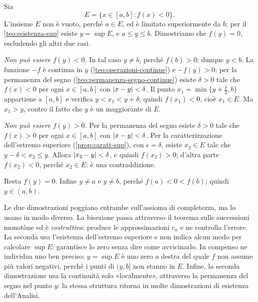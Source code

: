 \begin{dimostrazione}
Sia
\begin{equation}\label{eq:zeri-insieme-E}
  E=\{x\in[a,b] : f(x)<0\} .
\end{equation}
L'insieme $E$ non è vuoto, perché $a\in E$, ed è limitato superiormente da $b$; per il
\cref{teo:esistenza-sup} esiste $y=\sup E$, e $a\le y\le b$. Dimostriamo che $f(y)=0$,
escludendo gli altri due casi.

\emph{Non può essere $f(y)<0$.} In tal caso $y\neq b$, perché $f(b)>0$; dunque $y<b$. La
funzione $-f$ è continua in $y$ (\cref{teo:operazioni-continue}) e $-f(y)>0$: per la
permanenza del segno (\cref{teo:permanenza-segno-continue}) esiste $\delta>0$ tale che
$f(x)<0$ per ogni $x\in[a,b]$ con $\lvert x-y\rvert<\delta$. Il punto
$x_{1}=\min\bigl\{y+\frac\delta2,b\bigr\}$ appartiene a $[a,b]$ e verifica
$y<x_{1}<y+\delta$; quindi $f(x_{1})<0$, cioè $x_{1}\in E$. Ma $x_{1}>y$, contro il fatto
che $y$ è un maggiorante di $E$.

\emph{Non può essere $f(y)>0$.} Per la permanenza del segno esiste $\delta>0$ tale che
$f(x)>0$ per ogni $x\in[a,b]$ con $\lvert x-y\rvert<\delta$. Per la caratterizzazione
dell'estremo superiore (\cref{prop:caratt-sup}), con $\epsilon=\delta$, esiste $x_{2}\in E$
tale che $y-\delta<x_{2}\le y$. Allora $\lvert x_{2}-y\rvert<\delta$, e quindi $f(x_{2})>0$;
d'altra parte $f(x_{2})<0$, perché $x_{2}\in E$: è una contraddizione.

Resta $f(y)=0$. Infine $y\neq a$ e $y\neq b$, perché $f(a)<0<f(b)$; quindi $y\in(a,b)$.
\end{dimostrazione}

\begin{osservazione}\label{oss:zeri-due-vie}
Le due dimostrazioni poggiano entrambe sull'assioma di completezza, ma lo usano in modo
diverso. La bisezione passa attraverso il teorema sulle successioni monotòne ed è
\emph{costruttiva}: produce le approssimazioni $c_{n}$ e ne controlla l'errore. La
seconda usa l'esistenza dell'estremo superiore e non indica alcun modo per calcolare
$\sup E$: garantisce lo zero senza dire come avvicinarlo. In compenso ne individua uno
ben preciso: $y=\sup E$ è uno zero a destra del quale $f$ non assume più valori
negativi, perché i punti di $(y,b]$ non stanno in $E$. Infine, la seconda dimostrazione
usa la continuità solo «localmente», attraverso la permanenza del segno nel punto $y$:
la stessa struttura ritorna in molte dimostrazioni di esistenza dell'Analisi.
\end{osservazione}


